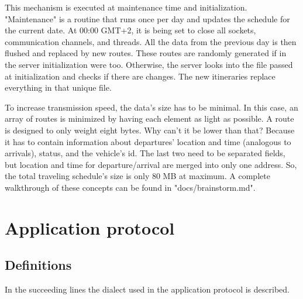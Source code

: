 \documentclass[runningheads]{llncs}
\begin{document}
This mechanism is executed at maintenance time and initialization. "Maintenance" is a routine that runs once per day and updates the schedule for the current date. At 00:00 GMT+2, it is being set to close all sockets, communication channels, and threads. All the data from the previous day is then flushed and replaced by new routes. These routes are randomly generated if in the server initialization were too. Otherwise, the server looks into the file passed at initialization and checks if there are changes. The new itineraries replace everything in that unique file.

To increase transmission speed, the data's size has to be minimal. In this case, an array of routes is minimized by having each element as light as possible. A route is designed to only weight eight bytes. Why can't it be lower than that? Because it has to contain information about departures' location and time (analogous to arrivals), status, and the vehicle's id. The last two need to be separated fields, but location and time for departure/arrival are merged into only one address. So, the total traveling schedule's size is only 80 MB at maximum. A complete walkthrough of these concepts can be found in "docs/brainstorm.md".

\newpage
\section{Application protocol}

\subsection{Definitions}

In the succeeding lines the dialect used in the application protocol is described.
\end{document}
